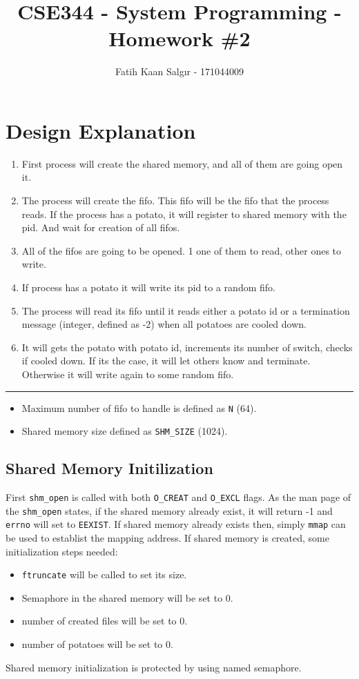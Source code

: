 \documentclass[a4paper]{article}
\author{Fatih Kaan Salgır - 171044009}
\date{}
\title{CSE344 - System Programming - Homework \#2}
\begin{document}
\maketitle

\section{Design Explanation}
\label{sec:orgb6045d4}

\begin{enumerate}
\item First process will create the shared memory, and all of them are going open it.
\item The process will create the fifo. This fifo will be the fifo that the process reads. If the process has a potato, it will register to shared memory with the pid. And wait for creation of all fifos.
\item All of the fifos are going to be opened. 1 one of them to read, other ones to write.
\item If process has a potato it will write its pid to a random fifo.
\item The process will read its fifo until it reads either a potato id or a termination message (integer, defined as -2) when all potatoes are cooled down.
\item It will gets the potato with potato id, increments its number of switch, checks if cooled down. If its the case, it will let others know and terminate. Otherwise it will write again to some random fifo.
\end{enumerate}

\noindent\rule{\textwidth}{0.5pt}

\begin{itemize}
\item Maximum number of fifo to handle is defined as \texttt{N} (64).
\item Shared memory size defined as \texttt{SHM\_SIZE} (1024).
\end{itemize}


\subsection{Shared Memory Initilization}
\label{sec:org6d0c5c0}
First \texttt{shm\_open} is called with both \texttt{O\_CREAT} and \texttt{O\_EXCL} flags. As the man page of the \texttt{shm\_open} states, if the shared memory already exist, it will return -1 and \texttt{errno} will set to \texttt{EEXIST}. 
If shared memory already exists then, simply \texttt{mmap} can be used to establist the mapping address.
If shared memory is created, some initialization steps needed:
\begin{itemize}
\item \texttt{ftruncate} will be called to set its size.
\item Semaphore in the shared memory will be set to 0.
\item number of created files will be set to 0.
\item number of potatoes will be set to 0.
\end{itemize}
Shared memory initialization is protected by using named semaphore.
\end{document}
